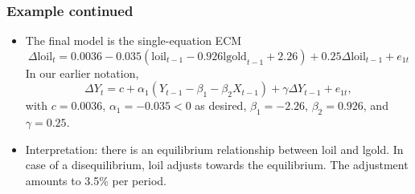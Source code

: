 \begin{frame}\frametitle{Example continued}
\begin{itemize}
\item The final model is the single-equation ECM
\[
\Delta \textrm{loil}_t=0.0036-0.035(\textrm{loil}_{t-1}-0.926\textrm{lgold}_{t-1}+2.26)+0.25\Delta\textrm{loil}_{t-1}+e_{1t}
\]
In our earlier notation,
\[
\Delta Y_t=c+\alpha_1(Y_{t-1}-\beta_1-\beta_2X_{t-1})+\gamma\Delta Y_{t-1} +e_{1t},
\]
with $c=0.0036$, $\alpha_1=-0.035<0$ as desired, $\beta_1=-2.26$, $\beta_2=0.926$, and $\gamma=0.25$.
\item Interpretation: there is an equilibrium relationship between \textrm{loil} and \textrm{lgold}. In case of a disequilibrium, \textrm{loil} adjusts towards the equilibrium. The adjustment amounts to 3.5\% per period.
\end{itemize}
\end{frame}

